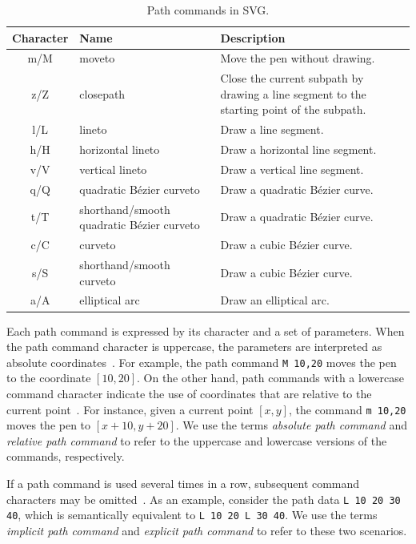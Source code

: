 \begin{table}[H]
    \centering
    
    \begin{tabular}{c p{4.5cm} p{5cm}}
        \toprule
        \textbf{Character} & \textbf{Name} & \textbf{Description} \\
        \midrule
        m\slash M & moveto & Move the pen without drawing. \\
        z\slash Z & closepath & Close the current subpath by drawing a line segment to the starting point of the subpath. \\ \hline
        l\slash L & lineto & Draw a line segment. \\
        h\slash H & horizontal lineto & Draw a horizontal line segment. \\
        v\slash V & vertical lineto & Draw a vertical line segment. \\ \hline
        q\slash Q & quadratic Bézier curveto & Draw a quadratic Bézier curve. \\
        t\slash T & shorthand\slash smooth quadratic Bézier curveto & Draw a quadratic Bézier curve. \\ \hline
        c\slash C & curveto & Draw a cubic Bézier curve. \\
        s\slash S & shorthand\slash smooth curveto & Draw a cubic Bézier curve.  \\ \hline
        a\slash A & elliptical arc & Draw an elliptical arc. \\
        \bottomrule
    \end{tabular}
    
    \caption{Path commands in SVG.}
    \label{tab:path-commands-theory}
\end{table}

Each path command is expressed by its character and a set of parameters. When the path command character is uppercase, the parameters are interpreted as absolute coordinates~\cite[Sec.~8.3]{svg11}. For example, the path command \texttt{M 10,20} moves the pen to the coordinate $[10, 20]$. On the other hand, path commands with a lowercase command character indicate the use of coordinates that are relative to the current point~\cite[Sec.~8.3]{svg11}. For instance, given a current point $[x, y]$, the command \texttt{m 10,20} moves the pen to $[x + 10, y + 20]$. We use the terms \emph{absolute path command} and \emph{relative path command} to refer to the uppercase and lowercase versions of the commands, respectively.

If a path command is used several times in a row, subsequent command characters may be omitted~\cite[Sec.~8.3.1]{svg11}. As an example, consider the path data \texttt{L 10 20 30 40}, which is semantically equivalent to \texttt{L 10 20 L 30 40}. We use the terms \emph{implicit path command} and \emph{explicit path command} to refer to these two scenarios.

